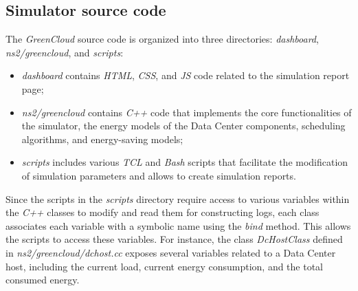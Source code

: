 \subsection{Simulator source code} \label{subsection:greencloud_code}
The \emph{GreenCloud} source code is organized into three directories: \emph{dashboard}, \emph{ns2/greencloud}, and \emph{scripts}:
\begin{itemize}
\item \emph{dashboard} contains \emph{HTML}, \emph{CSS}, and \emph{JS} code related to the simulation report page;
\item \emph{ns2/greencloud} contains \emph{C++} code that implements the core functionalities of the simulator, the energy models of the Data Center components, scheduling algorithms, and energy-saving models;
\item \emph{scripts} includes various \emph{TCL} and \emph{Bash} scripts that facilitate the modification of simulation parameters and allows to create simulation reports.
\end{itemize}
Since the scripts in the \emph{scripts} directory require access to various variables within the \emph{C++} classes to modify and read them for constructing logs, each class associates each variable with a symbolic name using the \emph{bind} method. This allows the scripts to access these variables.
For instance, the class \emph{DcHostClass} defined in \emph{ns2/greencloud/dchost.cc} exposes several variables related to a Data Center host, including the current load, current energy consumption, and the total consumed energy.

